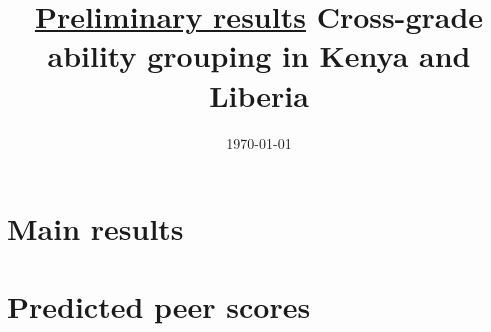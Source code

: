 \documentclass[11pt]{article}
\title{\underline{Preliminary results} \linebreak
	Cross-grade ability grouping in Kenya and Liberia}
\date{\today}
\begin{document}
	\maketitle

\centering

\section*{Main results}

\begin{table}[H]
	\caption{Kenya, year 1}
	
\end{table}

\begin{table}[H]
	\caption{Kenya, year 2}
	
\end{table}

\begin{table}[H]
	\caption{Liberia, grades 1-2}
	
\end{table}

\begin{table}[H]
	\caption{Liberia, grades 3-4}
	
\end{table}

\begin{table}[H]
	\caption{Liberia, all grades}
	
\end{table}

\section*{Predicted peer scores}

\begin{table}[H]
	\caption{Kenya, year 1}
	
\end{table}

\begin{table}[H]
	\caption{Kenya, year 2}
	
\end{table}

\begin{table}[H]
	\caption{Liberia, grades 1-2}
	
\end{table}

\begin{table}[H]
	\caption{Liberia, grades 3-4}
	
\end{table}
\end{document}
